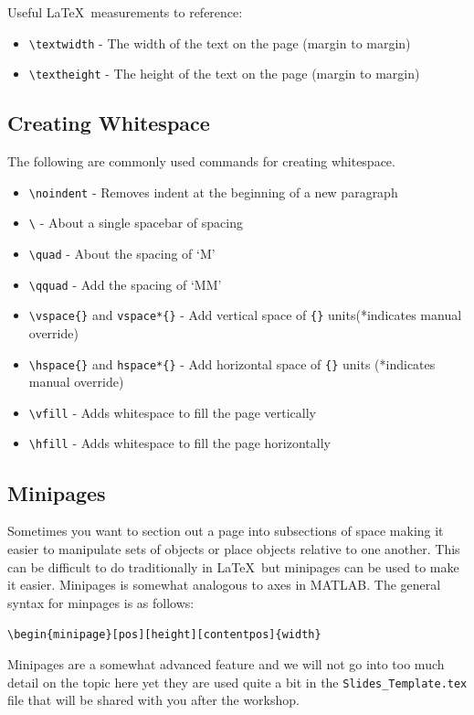 \documentclass[]{article}%
\newcommand{\bs}{\textbackslash}
\newcommand{\TT}[1]{\texttt{#1}}
\newcommand{\tpc}{\textperiodcentered}
\theoremstyle{definition}
\begin{document}
\noindent Useful \LaTeX\ measurements to reference:
\begin{itemize}
	\item \TT{\bs textwidth} - The width of the text on the page (margin to margin)
	\item \TT{\bs textheight} - The height of the text on the page (margin to margin)
\end{itemize}

\subsection{Creating Whitespace}
The following are commonly used commands for creating whitespace.
 
\begin{itemize}
	\item \TT{\bs noindent} - Removes indent at the beginning of a new paragraph
	\item \TT{\bs} - About a single spacebar of spacing
	\item \TT{\bs quad} - About the spacing of `M'
	\item \TT{\bs qquad} - Add the spacing of `MM'
	\item \TT{\bs vspace\{\tpc\}} and \TT{vspace*\{\tpc\}} - Add vertical space of \TT{\{\tpc\}} units(*indicates manual override)
	\item \TT{\bs hspace\{\tpc\}} and \TT{hspace*\{\tpc\}} - Add horizontal space of \TT{\{\tpc\}} units (*indicates manual override)
	\item \TT{\bs vfill} - Adds whitespace to fill the page vertically
	\item \TT{\bs hfill} - Adds whitespace to fill the page horizontally
\end{itemize}

\subsection{Minipages}
Sometimes you want to section out a page into subsections of space making it easier to manipulate sets of objects or place objects relative to one another.
This can be difficult to do traditionally in \LaTeX\ but minipages can be used to make it easier.
Minipages is somewhat analogous to axes in MATLAB.
The general syntax for minpages is as follows:
\begin{center}
	\TT{\bs begin\{minipage\}[pos][height][contentpos]\{width\}}\\
\end{center}
Minipages are a somewhat advanced feature and we will not go into too much detail on the topic here yet they are used quite a bit in the \TT{Slides\_Template.tex} file that will be shared with you after the workshop.
\end{document}

